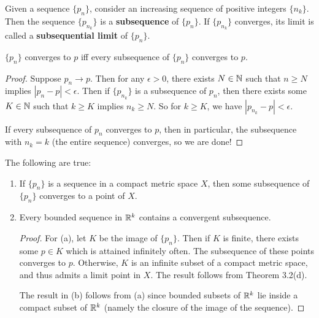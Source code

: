 \begin{definition} %
Given a sequence $\{p_n\}$, consider an increasing sequence of positive integers $\{n_k\}$. Then the sequence $\{p_{n_k}\}$ is a \textbf{subsequence} of $\{p_n\}$. If $\{p_{n_k}\}$ converges, its limit is called a \textbf{subsequential limit} of $\{p_n\}$.
\end{definition}

\begin{theorem} %
$\{p_n\}$ converges to $p$ iff every subsequence of $\{p_n\}$ converges to $p$. 

\begin{proof}
Suppose $p_n \to p$. Then for any $\epsilon > 0$, there exists $N \in \mathbb{N}$ such that $n \ge N$ implies $|p_n - p| < \epsilon$. Then if $\{p_{n_k}\}$ is a subsequence of $p_n$, then there exists some $K \in \mathbb{N}$ such that $k \ge K$ implies $n_k \ge N$. So for $k \ge K$, we have $|p_{n_k} - p| < \epsilon$. 

If every subsequence of $p_n$ converges to $p$, then in particular, the subsequence with $n_k = k$ (the entire sequence) converges, so we are done!
\end{proof}
\end{theorem}

\begin{theorem} %
The following are true:
\begin{enumerate}
\item If $\{p_n\}$ is a sequence in a compact metric space $X$, then some subsequence of $\{p_n\}$ converges to a point of $X$.

\item Every bounded sequence in $\mathbb{R}^k$ contains a convergent subsequence.

\begin{proof}
For (a), let $K$ be the image of $\{p_n\}$. Then if $K$ is finite, there exists some $p \in K$ which is attained infinitely often. The subsequence of these points converges to $p$. Otherwise, $K$ is an infinite subset of a compact metric space, and thus admits a limit point in $X$. The result follows from Theorem 3.2(d).

The result in (b) follows from (a) since bounded subsets of $\mathbb{R}^k$ lie inside a compact subset of $\mathbb{R}^k$ (namely the closure of the image of the sequence). 
\end{proof}
\end{enumerate}
\end{theorem}


